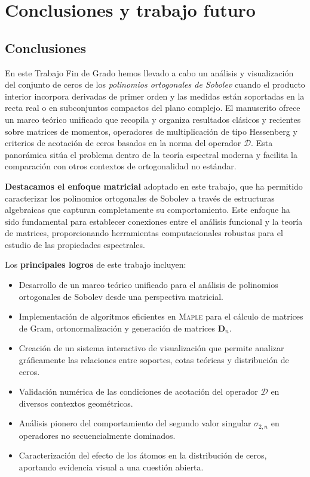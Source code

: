 \chapter{Conclusiones y trabajo futuro}
\label{sec:conclusiones}
\section{Conclusiones}

En este Trabajo Fin de Grado hemos llevado a cabo un análisis y visualización del conjunto de ceros de los \emph{polinomios ortogonales de Sobolev} cuando el producto interior incorpora derivadas de primer orden y las medidas están soportadas en la recta real o en subconjuntos compactos del plano complejo. El manuscrito ofrece un marco teórico unificado que recopila y organiza resultados clásicos y recientes sobre matrices de momentos, operadores de multiplicación de tipo Hessenberg y criterios de acotación de ceros basados en la norma del operador \(\mathcal{D}\). Esta panorámica sitúa el problema dentro de la teoría espectral moderna y facilita la comparación con otros contextos de ortogonalidad no estándar.

\textbf{Destacamos el enfoque matricial} adoptado en este trabajo, que ha permitido caracterizar los polinomios ortogonales de Sobolev a través de estructuras algebraicas que capturan completamente su comportamiento. Este enfoque ha sido fundamental para establecer conexiones entre el análisis funcional y la teoría de matrices, proporcionando herramientas computacionales robustas para el estudio de las propiedades espectrales.

Los \textbf{principales logros} de este trabajo incluyen:
\begin{itemize}
	\item Desarrollo de un marco teórico unificado para el análisis de polinomios ortogonales de Sobolev desde una perspectiva matricial.
	\item Implementación de algoritmos eficientes en \textsc{Maple} para el cálculo de matrices de Gram, ortonormalización y generación de matrices \(\mathbf{D}_n\).
	\item Creación de un sistema interactivo de visualización que permite analizar gráficamente las relaciones entre soportes, cotas teóricas y distribución de ceros.
	\item Validación numérica de las condiciones de acotación del operador \(\mathcal{D}\) en diversos contextos geométricos.
	\item Análisis pionero del comportamiento del segundo valor singular \(\sigma_{2,n}\) en operadores no secuencialmente dominados.
	\item Caracterización del efecto de los átomos en la distribución de ceros, aportando evidencia visual a una cuestión abierta.
\end{itemize}

